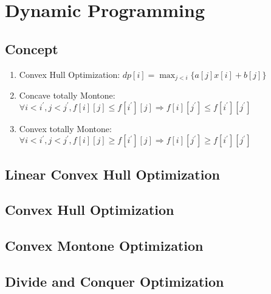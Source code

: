 \documentclass[a4paper,10pt,twocolumn,oneside]{article}
\begin{document}
\section{Dynamic Programming}
\subsection{Concept}
\begin{enumerate}
    \item Convex Hull Optimization: $dp[i] = \max_{j < i} \{ a[j]x[i] + b[j] \}$
    \item Concave totally Montone: $\forall i < i^\prime, j < j^\prime, f[i][j]\leq f[i^\prime][j]\Rightarrow f[i][j^\prime]\leq f[i^\prime][j^\prime]$
    \item Convex totally Montone: $\forall i < i^\prime, j < j^\prime, f[i][j]\geq f[i^\prime][j]\Rightarrow f[i][j^\prime]\geq f[i^\prime][j^\prime]$
\end{enumerate}
\subsection{Linear Convex Hull Optimization}

\subsection{Convex Hull Optimization}

\subsection{Convex Montone Optimization}

\subsection{Divide and Conquer Optimization}

\end{document}
